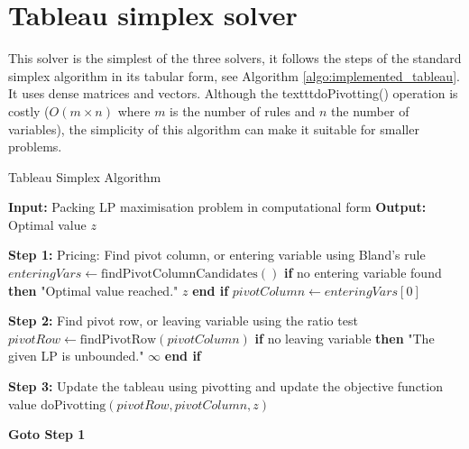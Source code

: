 \section{Tableau simplex solver}
This solver is the simplest of the three solvers, it follows the steps of the standard simplex
algorithm in its tabular form, see Algorithm \ref{algo:implemented_tableau}. It uses dense matrices and vectors.
Although the
texttt{doPivotting()} operation is costly (\( O(m \times n) \) where $m$ is the number of rules and
$n$ the number of variables), the simplicity of this algorithm can make it suitable for
smaller problems.
\begin{algorithm}
    \caption{Tableau Simplex Algorithm}
    \begin{algorithmic}[1]
        \State \textbf{Input:} Packing LP maximisation problem in computational form
        \State \textbf{Output:} Optimal value $z$

        \State \textbf{Step 1:} Pricing: Find pivot column, or entering variable using Bland's rule
        \State \hspace{\algorithmicindent} $enteringVars \gets \text{findPivotColumnCandidates}()$
        \State \hspace{\algorithmicindent} \textbf{if} no entering variable found \textbf{then}
        \State \hspace{\algorithmicindent} \hspace{\algorithmicindent}  "Optimal value reached."
        \State \hspace{\algorithmicindent} \hspace{\algorithmicindent} \Return $z$
        \State \hspace{\algorithmicindent} \textbf{end if}
        \State \hspace{\algorithmicindent} $pivotColumn \gets enteringVars[0]$

        \State \textbf{Step 2:} Find pivot row, or leaving variable using the ratio test
        \State \hspace{\algorithmicindent} $pivotRow \gets \text{findPivotRow}(pivotColumn)$
        \State \hspace{\algorithmicindent} \textbf{if} no leaving variable \textbf{then}
        \State \hspace{\algorithmicindent} \hspace{\algorithmicindent}  "The given LP is unbounded."
        \State \hspace{\algorithmicindent} \hspace{\algorithmicindent} \Return $\infty$
        \State \hspace{\algorithmicindent} \textbf{end if}

        \State \textbf{Step 3:} Update the tableau using pivotting and update the objective function value
        \State \hspace{\algorithmicindent} $\text{doPivotting}(pivotRow, pivotColumn, z)$

        \State \textbf{Goto Step 1}
    \end{algorithmic}
    \label{algo:implemented_tableau}
\end{algorithm}
